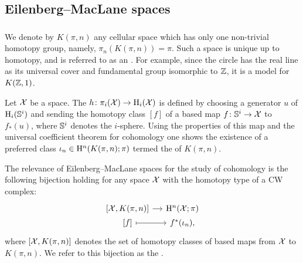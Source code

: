 \subsection{Eilenberg--MacLane spaces}

\subsubsection{}

We denote by $K(\pi, n)$ any cellular space which has only one non-trivial homotopy group, namely, $\pi_n(K(\pi, n)) = \pi$.
Such a space is unique up to homotopy, and is referred to as an .
For example, since the circle has the real line as its universal cover and fundamental group isomorphic to $\mathbb{Z}$, it is a model for $K(\mathbb{Z},1)$.

Let $\mathcal{X}$ be a space.
The  $h \colon \pi_i(\mathcal{X}) \to \mathrm{H}_i(\mathcal{X})$ is defined by choosing a generator $u$ of $\mathrm{H}_i(\mathbb{S}^i)$ and sending the homotopy class $[f]$ of a based map $f \colon \mathbb{S}^i \to \mathcal{X}$ to $f_*(u)$, where $\mathbb{S}^i$ denotes the $i$-sphere.
Using the properties of this map and the universal coefficient theorem for cohomology one shows the existence of a preferred class $\iota_n \in \mathrm{H}^n(K(\pi, n); \pi)$ termed the  of $K(\pi, n)$.

The relevance of Eilenberg--MacLane spaces for the study of cohomology is the following bijection holding for any space \(\mathcal{X}\) with the homotopy type of a CW complex:
\[
\begin{tikzcd}[column sep=small, row sep=0]
	{[\cX, K(\pi, n)]} \rar & \rH^n(\cX; \pi) \\
	{[f]} \rar[maps to] & f^*(\iota_n),
\end{tikzcd}
\]
where $[\mathcal{X}, K(\pi, n)]$ denotes the set of homotopy classes of based maps from $\mathcal{X}$ to $K(\pi, n)$.
We refer to this bijection as the .

